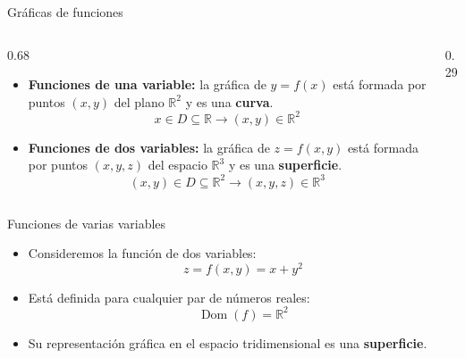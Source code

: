 \documentclass[main.tex]{subfiles}
\begin{document}
\begin{frame}{Gráficas de funciones}
  \begin{columns}[c,onlytextwidth]
    \begin{column}{0.68\textwidth}
      \begin{itemize}
        \item \textbf{Funciones de una variable:} la gráfica de
              $y=f(x)$ está formada por puntos $(x,y)$ del plano
              $\mathbb{R}^2$ y es una \textbf{curva}.
              \[
                x\in D\subseteq\mathbb{R}
                \longrightarrow (x,y)\in\mathbb{R}^2
              \]

        \item \textbf{Funciones de dos variables:} la gráfica de
              $z=f(x,y)$ está formada por puntos $(x,y,z)$ del espacio
              $\mathbb{R}^3$ y es una \textbf{superficie}.
              \[
                (x,y)\in D\subseteq\mathbb{R}^2
                \longrightarrow (x,y,z)\in\mathbb{R}^3
              \]
      \end{itemize}
    \end{column}
    \begin{column}{0.29\textwidth}
      \centering
    \end{column}
  \end{columns}
\end{frame}

\begin{frame}{Funciones de varias variables}
  \begin{itemize}
    \item Consideremos la función de dos variables:
          \[
            z=f(x,y)=x+y^2
          \]

    \item Está definida para cualquier par de números reales:
          \[
            \operatorname{Dom}(f)=\mathbb{R}^2
          \]

    \item Su representación gráfica en el espacio tridimensional
          es una \textbf{superficie}.
  \end{itemize}

\end{frame}

\end{document}
